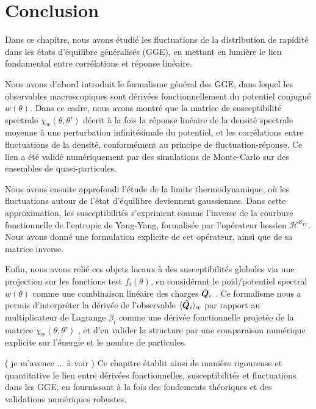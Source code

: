 \section*{Conclusion}

{\color{blue} 
Dans ce chapitre, nous avons étudié les fluctuations de la distribution de rapidité dans les états d’équilibre généralisés (GGE), en mettant en lumière le lien fondamental entre corrélations et réponse linéaire.

Nous avons d’abord introduit le formalisme général des GGE, dans lequel les observables macroscopiques sont dérivées fonctionnellement du potentiel conjugué $w(\theta)$. Dans ce cadre, nous avons montré que la matrice de susceptibilité spectrale $\chi_w(\theta , \theta')$ décrit à la fois la réponse linéaire de la densité spectrale moyenne à une perturbation infinitésimale du potentiel, et les corrélations entre fluctuations de la densité, conformément au principe de fluctuation-réponse. Ce lien a été validé numériquement par des simulations de Monte-Carlo sur des ensembles de quasi-particules.

Nous avons ensuite approfondi l’étude de la limite thermodynamique, où les fluctuations autour de l’état d’équilibre deviennent gaussiennes. Dans cette approximation, les susceptibilités s’expriment comme l’inverse de la courbure fonctionnelle de l’entropie de Yang-Yang, formalisée par l’opérateur hessien $\mathcal{H}^{\mathcal{S}_{YY}}$. Nous avons donné une formulation explicite de cet opérateur, ainsi que de sa matrice inverse.

Enfin, nous avons relié ces objets locaux à des susceptibilités globales via une projection sur les fonctions test $f_i(\theta)$, en considérant le poid/potentiel spectral $w(\theta)$ comme une combinaison linéaire des charges $\hat{\bm{Q}}_i$ . Ce formalisme nous a permis d’interpréter la dérivée de l’observable $\langle \hat{\bm{Q}}_i \rangle_w$ par rapport au multiplicateur de Lagrange $\beta_i$ comme une dérivée fonctionnelle projetée de la matrice $\chi_w(\theta , \theta')$ , et d’en valider la structure par une comparaison numérique explicite sur l’énergie et le nombre de particules.

{\color{red} ( je m'avence ... à voir ) } 
Ce chapitre établit ainsi de manière rigoureuse et quantitative le lien entre dérivées fonctionnelles, susceptibilités et fluctuations dans les GGE, en fournissant à la fois des fondements théoriques et des validations numériques robustes.

}

